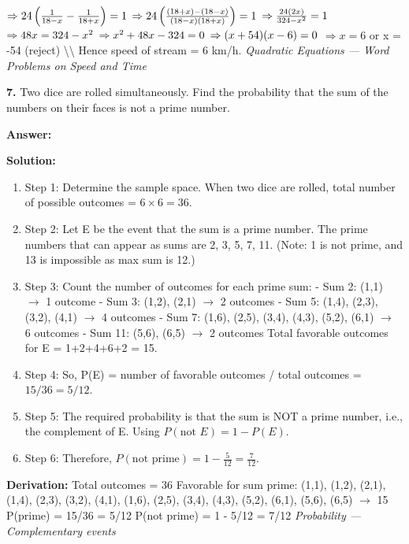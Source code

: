 \documentclass[12pt,a4paper]{exam}
\newcommand{\fitmath}[1]{%
  \sbox{\schmathbox}{$\displaystyle #1$}%
  \ifdim\wd\schmathbox>\linewidth
    \resizebox{\linewidth}{!}{\usebox{\schmathbox}}%
  \else
    \usebox{\schmathbox}%
  \fi}
\begin{document}
\begin{questions}
 $\Rightarrow 24\left(\frac{1}{18-x} - \frac{1}{18+x}\right) = 1 \\$
 $\Rightarrow 24\left(\frac{(18+x)-(18-x)}{(18-x)(18+x)}\right) = 1 \\$
 $\Rightarrow \frac{24(2x)}{324 - x^2} = 1 \\$
 $\Rightarrow 48x = 324 - x^2 \\$
 $\Rightarrow x^2 + 48x - 324 = 0 \\$
 $\Rightarrow (x+54)(x-6)=0 \\$
 $\Rightarrow x = 6$  or  x = -54  (reject) \textbackslash{}\textbackslash{}
Hence speed of stream =  6  km/h.
\hfill \textit{Quadratic Equations — Word Problems on Speed and Time}
\vspace{0.3cm}

\question \textbf{7.} Two dice are rolled simultaneously. Find the probability that the sum of the numbers on their faces is not a prime number.

\textbf{Answer:}
\begin{center}
\fitmath{\frac{7}{12}}
\end{center}

\textbf{Solution:}
\begin{enumerate}
  \item Step 1: Determine the sample space. When two dice are rolled, total number of possible outcomes = $6 \times 6 = 36$.
  \item Step 2: Let E be the event that the sum is a prime number. The prime numbers that can appear as sums are 2, 3, 5, 7, 11. (Note: 1 is not prime, and 13 is impossible as max sum is 12.)
  \item Step 3: Count the number of outcomes for each prime sum:
- Sum 2: (1,1) $\to$ 1 outcome
- Sum 3: (1,2), (2,1) $\to$ 2 outcomes
- Sum 5: (1,4), (2,3), (3,2), (4,1) $\to$ 4 outcomes
- Sum 7: (1,6), (2,5), (3,4), (4,3), (5,2), (6,1) $\to$ 6 outcomes
- Sum 11: (5,6), (6,5) $\to$ 2 outcomes
Total favorable outcomes for E = 1+2+4+6+2 = 15.
  \item Step 4: So, P(E) = number of favorable outcomes / total outcomes = $15/36 = 5/12$.
  \item Step 5: The required probability is that the sum is NOT a prime number, i.e., the complement of E. Using $P(\text{not } E) = 1 - P(E)$.
  \item Step 6: Therefore, $P(\text{not prime}) = 1 - \frac{5}{12} = \frac{7}{12}$.
\end{enumerate}
\textbf{Derivation:}
Total outcomes = 36
Favorable for sum prime: (1,1), (1,2), (2,1), (1,4), (2,3), (3,2), (4,1), (1,6), (2,5), (3,4), (4,3), (5,2), (6,1), (5,6), (6,5) $\to$ 15
P(prime) = 15/36 = 5/12
P(not prime) = 1 - 5/12 = 7/12
\hfill \textit{Probability — Complementary events}
\vspace{0.3cm}


\end{questions}
\end{document}
